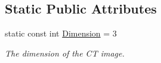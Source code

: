 \subsection*{Static Public Attributes}
\begin{DoxyCompactItemize}
\item 
\hypertarget{classctimage_1_1_c_t_image_ad28aaad081539a4a2e7f1cc38c06aa3a}{
static const int \hyperlink{classctimage_1_1_c_t_image_ad28aaad081539a4a2e7f1cc38c06aa3a}{Dimension} = 3}
\label{classctimage_1_1_c_t_image_ad28aaad081539a4a2e7f1cc38c06aa3a}

\begin{DoxyCompactList}\small\item\em The dimension of the CT image. \item\end{DoxyCompactList}\end{DoxyCompactItemize}
